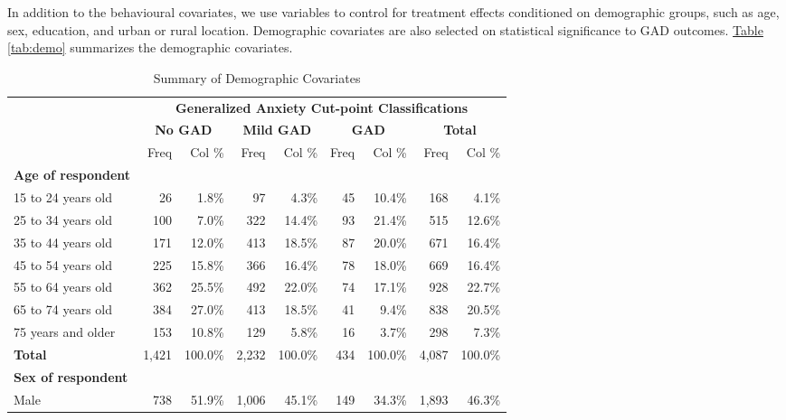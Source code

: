 \documentclass{article}[12pt]
\begin{document}
        
        In addition to the behavioural covariates, we use variables to control for treatment effects conditioned on demographic groups, such as age, sex, education, and urban or rural location. Demographic covariates are also selected on statistical significance to GAD outcomes. \hyperref[tab:demo]{Table \ref{tab:demo}} summarizes the demographic covariates.
        
        \newpage
        \begin{table}[h!]
            \centering
        \begin{threeparttable}
            
            \caption{Summary of Demographic Covariates}
            \begin{tabular}{lrrrrrrrr}
                \hline
                \hline
                 & \multicolumn{8}{c}{\textbf{Generalized Anxiety Cut-point Classifications}} \\
                 & \multicolumn{2}{c}{\textbf{No GAD}} & \multicolumn{2}{c}{\textbf{Mild GAD}} & \multicolumn{2}{c}{\textbf{GAD}} & \multicolumn{2}{c}{\textbf{Total}} \\
                 \cmidrule(lr){2-3}\cmidrule(lr){4-5}\cmidrule(lr){6-7}\cmidrule(lr){8-9}
                &Freq&Col \%&Freq&Col \%&Freq&Col \%&Freq&Col \% \\
                \hline
                \textbf{Age of respondent}&&&&&&&& \\
                15 to 24 years old&26&1.8\%&97&4.3\%&45&10.4\%&168&4.1\% \\
                25 to 34 years old&100&7.0\%&322&14.4\%&93&21.4\%&515&12.6\% \\
                35 to 44 years old&171&12.0\%&413&18.5\%&87&20.0\%&671&16.4\% \\
                45 to 54 years old&225&15.8\%&366&16.4\%&78&18.0\%&669&16.4\% \\
                55 to 64 years old&362&25.5\%&492&22.0\%&74&17.1\%&928&22.7\% \\
                65 to 74 years old&384&27.0\%&413&18.5\%&41&9.4\%&838&20.5\% \\
                75 years and older&153&10.8\%&129&5.8\%&16&3.7\%&298&7.3\% \\
                \textbf{Total}&1,421&100.0\%&2,232&100.0\%&434&100.0\%&4,087&100.0\% \\
                \hline
                \textbf{Sex of respondent}&&&&&&&& \\
                Male&738&51.9\%&1,006&45.1\%&149&34.3\%&1,893&46.3\% \\

\end{tabular}
\end{threeparttable}
\end{table}
\end{document}
